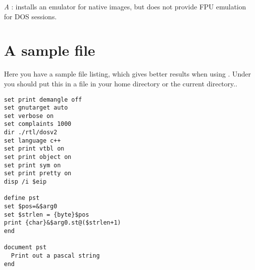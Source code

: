 \documentclass{report}
\begin{document}
{\em   A} : \ostwo installs an emulator for native \ostwo images, but does not
   provide FPU emulation for DOS sessions.


\chapter{A sample  file}
\label{ch:GdbIniFile}

Here you have a sample  file listing, which gives better
results when using . Under \linux you should put this in a
 file in your home directory or the current directory..  
 
\begin{verbatim}
set print demangle off
set gnutarget auto
set verbose on
set complaints 1000
dir ./rtl/dosv2
set language c++
set print vtbl on
set print object on
set print sym on
set print pretty on
disp /i $eip

define pst
set $pos=&$arg0
set $strlen = {byte}$pos
print {char}&$arg0.st@($strlen+1)
end

document pst
  Print out a pascal string
end    
\end{verbatim}
\end{document}
